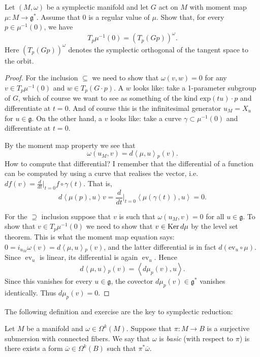 \begin{exercise}
\label{exercise-tangent-moment-level-set}
Let $(M,\omega)$ be a symplectic manifold
and let $G$ act on $M$ with moment map
$\mu:M\to\mathfrak{g}^*$.
Assume that $0$ is a regular value of
$\mu$.
Show that, for every $p \in \mu^{-1}(0)$,
we have
$$
T_p\mu^{-1}(0)
=
(T_p(Gp))^\omega.
$$
Here $(T_p(Gp))^\omega$ denotes the
symplectic orthogonal of the tangent
space to the orbit.
\end{exercise}

\begin{proof}
For the inclusion $\subseteq$
we need to show that $\omega(v,w)=0$
for any $v \in T_p\mu^{-1}(0)$
and $w \in T_p(G\cdot p)$.
A $w$ looks like: take a 1-parameter
subgroup of $G$, which of course
we want to see as something of the kind
$\text{exp}(tu)\cdot p$ and differentiate
at $t=0$. And of course this is the
infinitesimal generator $u_M = X_u$
for $u \in \mathfrak{g}$.
On the other hand, a $v$ looks like:
take a curve $\gamma \subset \mu^{-1}(0)$
and differentiate at $t=0$.

By the moment map property we see that
$$
\omega(u_M,v)=d\left\langle{}\mu,u\right\rangle{}_p(v).
$$
How to compute that differential?
I remember that the differential of a
function can be computed by
using a curve that realises the vector,
i.e. $df(v) = \frac{d}{dt}\Big|_{t=0}
f\circ \gamma(t)$.
That is,
$$
d\left\langle{}\mu(p),u\right\rangle{}v
=\frac{d}{dt}\Big|_{t=0}
\left\langle{}\mu(\gamma(t)),u\right\rangle{}=0.
$$

For the $\supseteq$ inclusion
suppose that $v$ is such that
$\omega(u_M,v)=0$ for all
$u \in \mathfrak{g}$.
To show that $v \in T_p\mu^{-1}(0)$
we need to show that
$v \in \mathop{\mathrm{Ker}} d\mu$ by the
level set theorem.
This is what the moment map equation says:
$0=i_{u_M}\omega(v)
=d\left\langle{}\mu,u\right\rangle{}_p(v)$,
and the latter differential is in fact
$d(\text{ev}_u \circ \mu)$.
Since $\operatorname{ev}_u$ is linear, its
differential is again $\operatorname{ev}_u$.
Hence
$$
d\left\langle{}\mu,u\right\rangle{}_p(v)
=
\left\langle{}d\mu_p(v),u\right\rangle{}.
$$
Since this vanishes for every
$u \in \mathfrak{g}$, the covector
$d\mu_p(v)\in\mathfrak{g}^*$ vanishes
identically. Thus $d\mu_p(v)=0$.
\end{proof}

\noindent
The following definition
and exercise are the
key to symplectic reduction:

\begin{definition}
\label{definition-basic-form}
Let $M$ be a manifold and $\omega \in
\Omega^k(M)$.
Suppose that $\pi:M \to B$ is a surjective
submersion with connected fibers.
We say that $\omega$ is {\it basic} (with
respect
to $\pi$) is there exists a form
\(\overline{\omega}\in \Omega^k(B)\) such
that
\(\pi^*\overline{\omega}\).
\end{definition}

